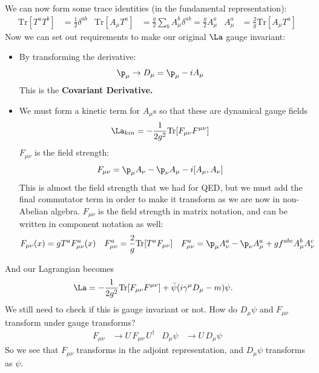 \documentclass[a4paper, 11pt, normalem]{report}
\begin{document}
We can now form some trace identities (in the fundamental representation):
\begin{align}
    \text{Tr}[T^aT^b] &= \frac12\delta^{ab} & \text{Tr}[A_\mu T^a] &= \frac{g}{2}\sum_b A_\mu^b\delta^{ab} = \frac{g}{2}A_\mu^a & A_\mu^a &= \frac{2}{g}\text{Tr}[A_\mu T^a]
\end{align}
Now we can set out requirements to make our original $\La$ gauge invariant:
\begin{itemize}
    \item By transforming the derivative:
        \begin{align}
            \p_\mu &\to D_\mu = \p_\mu - iA_\mu
        \end{align}
        This is the \textbf{Covariant Derivative.}
    \item We must form a kinetic term for $A_\mu$s so that these are dynamical gauge fields
        \begin{align}
            \La_{kin} &= -\frac{1}{2g^2}\text{Tr}[F_{\mu\nu}F^{\mu\nu}]
        \end{align}
        $F_{\mu\nu}$ is the field strength:
        \begin{align}
            F_{\mu\nu} &= \p_\mu A_\nu - \p_\nu A_\mu - i[A_\mu,A_\nu]
        \end{align}
        This is almost the field strength that we had for QED, but we must add the final commutator term in order to make it transform as we are now in non-Abelian algebra.
        $F_{\mu\nu}$ is the field strength in matrix notation, and can be written in component notation as well:
        \begin{align}
            F_{\mu\nu}(x) &= gT^aF^a_{\mu\nu}(x) &
            F^a_{\mu\nu} &= \frac2g \text{Tr}[T^aF_{\mu\nu}] &
            F_{\mu\nu}^a &= \p_\mu A_\nu^a - \p_\nu A_\mu^a + gf^{abc}A_\mu^bA_\nu^c
        \end{align}
\end{itemize}
And our Lagrangian becomes
\begin{align}
    \La &= -\frac{1}{2g^2}\text{Tr}[F_{\mu\nu}F^{\mu\nu}] + \bar{\psi}(i\gamma^\mu D_\mu - m)\psi.
\end{align}
We still need to check if this is gauge invariant or not.
How do $D_\mu\psi$ and $F_{\mu\nu}$ transform under gauge transforms?
\begin{align}
    F_{\mu\nu} &\to U\,F_{\mu\nu}\,U^\dagger & D_\mu\psi &\to U\,D_\mu\psi
\end{align}
So we see that $F_{\mu\nu}$ transforms in the adjoint representation, and $D_\mu\psi$ transforms as $\psi$.
\end{document}
